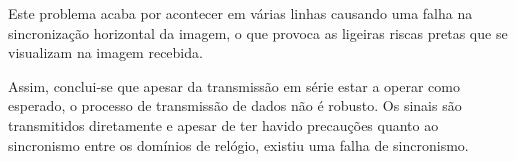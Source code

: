 \documentclass[11pt,a4paper]{article}
\begin{document}
	Este problema acaba por acontecer em várias linhas causando uma falha na sincronização horizontal da imagem, o que provoca as ligeiras riscas pretas que se visualizam na imagem recebida.
	
	
	Assim, conclui-se que apesar da transmissão em série estar a operar como esperado, o processo de transmissão de dados não é robusto. Os sinais são transmitidos diretamente e apesar de ter havido precauções quanto ao sincronismo entre os domínios de relógio, existiu uma falha de sincronismo.
	
	
	
	
	
\end{document}
